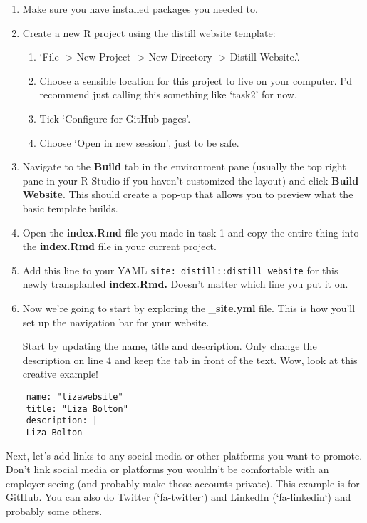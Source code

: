 \documentclass[
]{article}
\providecommand{\tightlist}{%
  \setlength{\itemsep}{0pt}\setlength{\parskip}{0pt}}
\begin{document}
\begin{enumerate}
\def\labelenumi{\arabic{enumi}.}
\item
  Make sure you have \protect\hyperlink{s1pre}{installed packages you needed to.}
\item
  Create a new R project using the distill website template:

  \begin{enumerate}
  \def\labelenumii{\alph{enumii}.}
  \tightlist
  \item
    `File -\textgreater{} New Project -\textgreater{} New Directory -\textgreater{} Distill Website.'.
  \item
    Choose a sensible location for this project to live on your computer. I'd recommend just calling this something like `task2' for now.
  \item
    Tick `Configure for GitHub pages'.
  \item
    Choose `Open in new session', just to be safe.
  \end{enumerate}
\item
  Navigate to the \textbf{Build} tab in the environment pane (usually the top right pane in your R Studio if you haven't customized the layout) and click \textbf{Build Website}. This should create a pop-up that allows you to preview what the basic template builds.
\item
  Open the \textbf{index.Rmd} file you made in task 1 and copy the entire thing into the \textbf{index.Rmd} file in your current project.
\item
  Add this line to your YAML \texttt{site:\ distill::distill\_website} for this newly transplanted \textbf{index.Rmd.} Doesn't matter which line you put it on.
\item
  Now we're going to start by exploring the \_\textbf{site.yml} file. This is how you'll set up the navigation bar for your website.

  Start by updating the name, title and description. Only change the description on line 4 and keep the tab in front of the text. Wow, look at this creative example!
\end{enumerate}

\begin{verbatim}
    name: "lizawebsite"
    title: "Liza Bolton"
    description: |
    Liza Bolton
\end{verbatim}

Next, let's add links to any social media or other platforms you want to promote. Don't link social media or platforms you wouldn't be comfortable with an employer seeing (and probably make those accounts private). This example is for GitHub. You can also do Twitter (`fa-twitter`) and LinkedIn (`fa-linkedin`) and probably some others.
\end{document}
